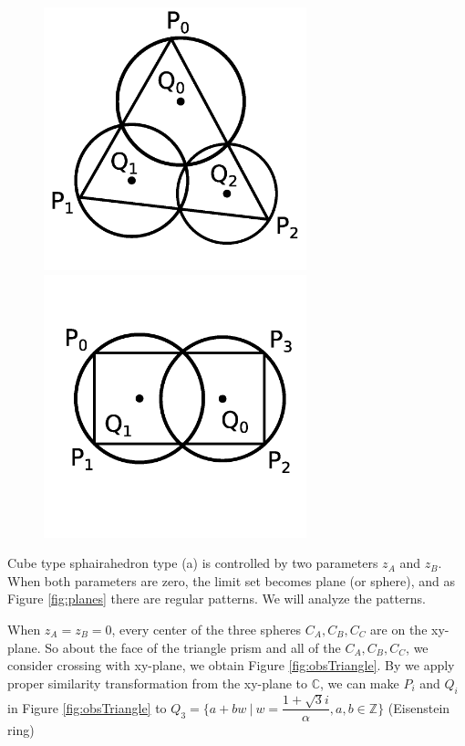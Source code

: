 \documentclass[suppldata, dvipdfmx]{interact}
\theoremstyle{plain}%
\theoremstyle{definition}
\theoremstyle{remark}
\theoremstyle{problemstyle}
\begin{document}
\begin{figure}[h!tbp]
 \begin{minipage}[t]{0.5\textwidth}
 \centering
 \includegraphics[width=3in,
 keepaspectratio]{./img/Observation/triangle.jpg}
 \caption{}
 \label{fig:obsTriangle}
 \end{minipage}
 \hspace*{\fill}
 \begin{minipage}[t]{0.5\textwidth}
  \centering
  \includegraphics[width=3in,
  keepaspectratio]{./img/Observation/rect.jpg}
  \caption{}
  \label{fig:obsRect}
 \end{minipage}
 \hspace*{\fill}
\end{figure}

Cube type sphairahedron type (a) is controlled by two parameters $z_A$
and $z_B$.
When both parameters are zero, the limit set becomes plane (or
sphere), and as Figure \ref{fig:planes} there are
regular patterns. We will analyze the patterns.

When $z_A = z_B = 0$, every center of the three spheres $C_A, C_B, C_C$
are on the xy-plane. So about the face of the triangle prism and all of the
$C_A, C_B, C_C$, we consider crossing with xy-plane, we obtain Figure
\ref{fig:obsTriangle}.
By we apply proper similarity transformation from the xy-plane to
$\mathbb{C}$, we can make $P_i$ and $Q_i$ in
Figure \ref{fig:obsTriangle} to
$Q_3 = \{ a+bw~|~w=\dfrac{1 + \sqrt{3}i}{\alpha}, a, b \in \mathbb{Z}\}$
(Eisenstein ring)
\end{document}
